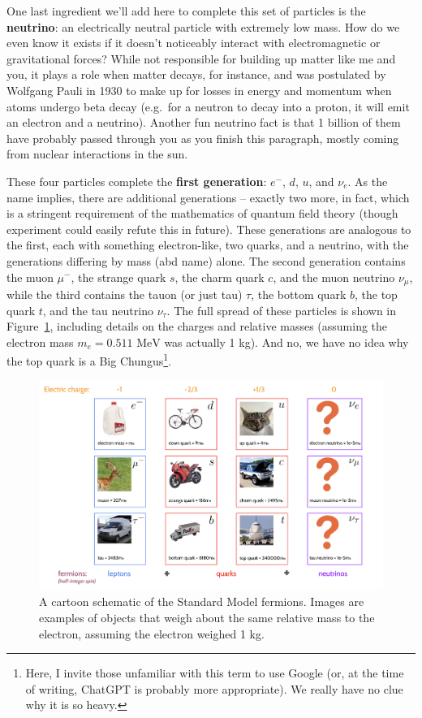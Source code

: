 \documentclass[
  11pt,
  numbers=noendperiod]{book}
\begin{document}
One last ingredient we'll add here to complete this set of particles is
the \textbf{neutrino}: an electrically neutral particle with extremely
low mass. How do we even know it exists if it doesn't noticeably
interact with electromagnetic or gravitational forces? While not
responsible for building up matter like me and you, it plays a role when
matter decays, for instance, and was postulated by Wolfgang Pauli in
1930 to make up for losses in energy and momentum when atoms undergo
beta decay (e.g.~for a neutron to decay into a proton, it will emit an
electron and a neutrino). Another fun neutrino fact is that 1 billion of
them have probably passed through you as you finish this paragraph,
mostly coming from nuclear interactions in the sun.

These four particles complete the \textbf{first generation}: \(e^-\),
\(d\), \(u\), and \(\nu_e\). As the name implies, there are additional
generations -- exactly two more, in fact, which is a stringent
requirement of the mathematics of quantum field theory (though
experiment could easily refute this in future). These generations are
analogous to the first, each with something electron-like, two quarks,
and a neutrino, with the generations differing by mass (abd name) alone.
The second generation contains the muon \(\mu^-\), the strange quark
\(s\), the charm quark \(c\), and the muon neutrino \(\nu_\mu\), while
the third contains the tauon (or just tau) \(\tau\), the bottom quark
\(b\), the top quark \(t\), and the tau neutrino \(\nu_\tau\). The full
spread of these particles is shown in Figure~\ref{fig-sm}, including
details on the charges and relative masses (assuming the electron mass
\(m_e = 0.511\) \(\text{MeV}\) was actually 1 kg). And no, we have no
idea why the top quark is a Big Chungus\footnote{Here, I invite those
  unfamiliar with this term to use Google (or, at the time of writing,
  ChatGPT is probably more appropriate). We really have no clue why it is so heavy.}.

\begin{figure}

{\centering \includegraphics{./images/sm.png}

}

\caption{\label{fig-sm}A cartoon schematic of the Standard Model
fermions. Images are examples of objects that weigh about the same
relative mass to the electron, assuming the electron weighed 1 kg.}

\end{figure}
\end{document}
